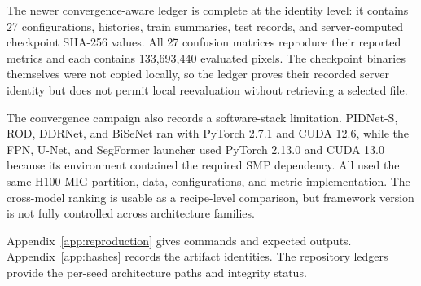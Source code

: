 The newer convergence-aware ledger is complete at the identity level: it
contains 27 configurations, histories, train summaries, test records, and
server-computed checkpoint SHA-256 values. All 27 confusion matrices reproduce
their reported metrics and each contains 133,693,440 evaluated pixels. The
checkpoint binaries themselves were not copied locally, so the ledger proves
their recorded server identity but does not permit local reevaluation without
retrieving a selected file.

The convergence campaign also records a software-stack limitation. PIDNet-S,
ROD, DDRNet, and BiSeNet ran with PyTorch 2.7.1 and CUDA 12.6, while the FPN,
U-Net, and SegFormer launcher used PyTorch 2.13.0 and CUDA 13.0 because its
environment contained the required SMP dependency. All used the same H100 MIG
partition, data, configurations, and metric implementation. The cross-model
ranking is usable as a recipe-level comparison, but framework version is not
fully controlled across architecture families.

Appendix~\ref{app:reproduction} gives commands and expected outputs.
Appendix~\ref{app:hashes} records the artifact identities. The repository ledgers
provide the per-seed architecture paths and integrity status.
